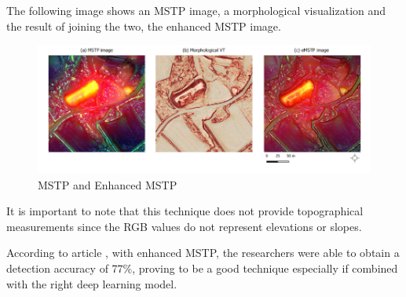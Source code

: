 The following image shows an MSTP image, a morphological visualization and the result of joining the two, the enhanced MSTP image.

\begin{figure}[H]
\centering
\includegraphics[width=12cm]{figs/mstp.png}
\caption{MSTP and Enhanced MSTP \cite{e2MSTP}}
\end{figure}

It is important to note that this technique does not provide topographical measurements since the RGB values do not represent elevations or slopes.

According to article \cite{e2MSTP}, with enhanced MSTP, the researchers were able to obtain a detection accuracy of 77\%, proving to be a good technique especially if combined with the right deep learning model.


